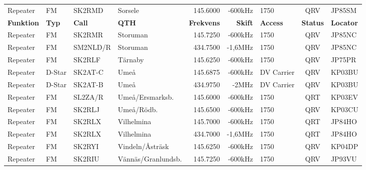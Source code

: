 \begin{landscape}
\begin{longtable}{llllrrlcl}
	Repeater          & FM           & SK2RMD        & Sorsele            &          145.6000 &        -600kHz & 1750             &       QRV       & JP85SM           \\
		\textbf{Funktion} & \textbf{Typ} & \textbf{Call} & \textbf{QTH}       & \textbf{Frekvens} & \textbf{Skift} & \textbf{Access}  & \textbf{Status} & \textbf{Locator} \\ \hline
	Repeater          & FM           & SK2RMR        & Storuman           &          145.7250 &        -600kHz & 1750             &       QRV       & JP85NC           \\
	Repeater          & FM           & SM2NLD/R      & Storuman           &          434.7500 &        -1,6MHz & 1750             &       QRV       & JP85NC           \\
	Repeater          & FM           & SK2RLF        & Tärnaby            &          145.6250 &        -600kHz & 1750             &       QRV       & JP75PR           \\
	Repeater          & D-Star       & SK2AT-C       & Umeå               &          145.6875 &        -600kHz & DV Carrier       &       QRV       & KP03BU           \\
	Repeater          & D-Star       & SK2AT-B       & Umeå               &          434.9750 &          -2MHz & DV Carrier       &       QRV       & KP03BU           \\
	Repeater          & FM           & SL2ZA/R       & Umeå/Ersmarksb.    &          145.6000 &        -600kHz & 1750             &       QRT       & KP03EV           \\
	Repeater          & FM           & SK2RLJ        & Umeå/Rödb.         &          145.6500 &        -600kHz & 1750             &       QRV       & KP03CU           \\
	Repeater          & FM           & SK2RLX        & Vilhelmina         &          145.7000 &        -600kHz & 1750             &       QRT       & JP84HO           \\
	Repeater          & FM           & SK2RLX        & Vilhelmina         &          434.7000 &        -1,6MHz & 1750             &       QRT       & JP84HO           \\
	Repeater          & FM           & SK2RYI        & Vindeln/Åsträsk    &          145.6250 &        -600kHz & 1750             &       QRV       & KP04DP           \\
	Repeater          & FM           & SK2RIU        & Vännäs/Granlundsb. &          145.7250 &        -600kHz & 1750             &       QRV       & JP93VU           \\

\end{longtable}
\end{landscape}
